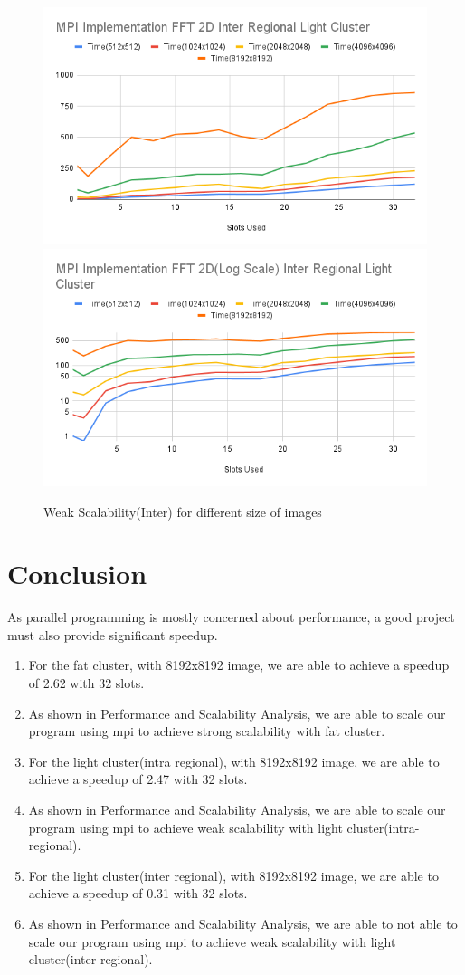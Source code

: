 \documentclass{article}
\begin{document}
\begin{figure}[hb]
    \includegraphics[width=.48\textwidth]{MPI Implementation FFT 2D Inter Regional Light Cluster.png}\hfill
    \includegraphics[width=.48\textwidth]{MPI Implementation FFT 2D(Log Scale) Inter Regional Light Cluster.png}
    \caption{Weak Scalability(Inter) for different size of images}
    \label{fig:Weak Scalability(Inter)}
\end{figure}
\newpage

\newpage

\section{Conclusion}

As parallel programming is mostly concerned about performance, a good project must also provide significant speedup.
\begin{enumerate}
    \item For the fat cluster, with 8192x8192 image, we are able to achieve a speedup of  2.62 with 32 slots. 
    \item As shown in Performance and Scalability Analysis, we are able to scale our program using mpi to achieve strong scalability with fat cluster.
    \item For the light cluster(intra regional), with 8192x8192 image, we are able to achieve a speedup of 2.47 with 32 slots.
    \item As shown in Performance and Scalability Analysis, we are able to scale our program using mpi to achieve weak scalability with light cluster(intra-regional).
    \item For the light cluster(inter regional), with 8192x8192 image, we are able to achieve a speedup of 0.31 with 32 slots.
    \item As shown in Performance and Scalability Analysis, we are able to not able to scale our program using mpi to achieve weak scalability with light cluster(inter-regional).
\end{enumerate}
\newpage
\end{document}
